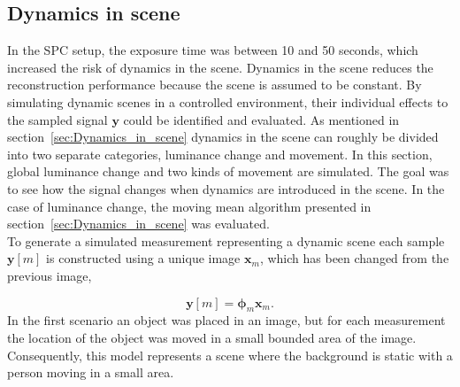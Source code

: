 \subsection{Dynamics in scene}
\label{sec:dyn_sim}
In the SPC setup, the exposure time was between 10 and 50 seconds, which increased the risk of dynamics in the scene. Dynamics in the scene reduces the reconstruction performance because the scene is assumed to be constant. By simulating dynamic scenes in a controlled environment, their individual effects to the sampled signal $\mathbf{y}$ could be identified and evaluated. As mentioned in section~\ref{sec:Dynamics_in_scene} dynamics in the scene can roughly be divided into two separate categories, luminance change and movement. In this section, global luminance change and two kinds of movement are simulated. The goal was to see how the signal changes when dynamics are introduced in the scene. In the case of luminance change, the moving mean algorithm presented in section~\ref{sec:Dynamics_in_scene} was evaluated.\\[0.1in]

To generate a simulated measurement representing a dynamic scene each sample $\mathbf{y}[m]$ is constructed using a unique image $\mathbf{x}_m$, which has been changed from the previous image,

\begin{equation}
\mathbf{y}[m] = \mathbf{\phi}_m\mathbf{x}_m.
\end{equation}
\newpage
In the first scenario an object was placed in an image, but for each measurement the location of the object was moved in a small bounded area of the image. Consequently, this model represents a scene where the background is static with a person moving in a small area.




